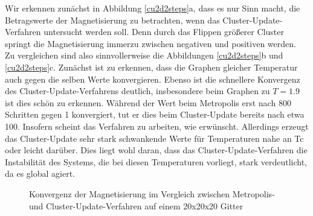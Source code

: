 Wir erkennen zunächst in Abbildung \ref{cu2d2steps}a, dass es nur Sinn macht, die Betragswerte der Magnetisierung zu betrachten, wenn das Cluster-Update-Verfahren untersucht werden soll. Denn durch das Flippen größerer Cluster springt die Magnetisierung immerzu zwischen negativen und positiven werden.\\
Zu vergleichen sind also sinnvollerweise die Abbildungen \ref{cu2d2steps}b und \ref{cu2d2steps}c. Zunächst ist zu erkennen, dass die Graphen gleicher Temperatur auch gegen die selben Werte konvergieren. Ebenso ist die schnellere Konvergenz des Cluster-Update-Verfahrens deutlich, insbesondere beim Graphen zu $T=1.9$ ist dies schön zu erkennen. Während der Wert beim Metropolis erst nach 800 Schritten gegen 1 konvergiert, tut er dies beim Cluster-Update bereits nach etwa 100. Insofern scheint das Verfahren zu arbeiten, wie erwünscht. Allerdings erzeugt das Cluster-Update sehr stark schwankende Werte für Temperaturen  nahe an Tc oder leicht darüber. Dies liegt wohl daran, dass das Cluster-Update-Verfahren die Instabilität des Systems, die bei diesen Temperaturen vorliegt, stark verdeutlicht, da es global agiert.

\begin{figure}[H]
	\centering
	\caption{Konvergenz der Magnetisierung im Vergleich zwischen Metropolis- und Cluster-Update-Verfahren auf einem 20x20x20 Gitter}
	\label{cu2d3steps}
\end{figure}

